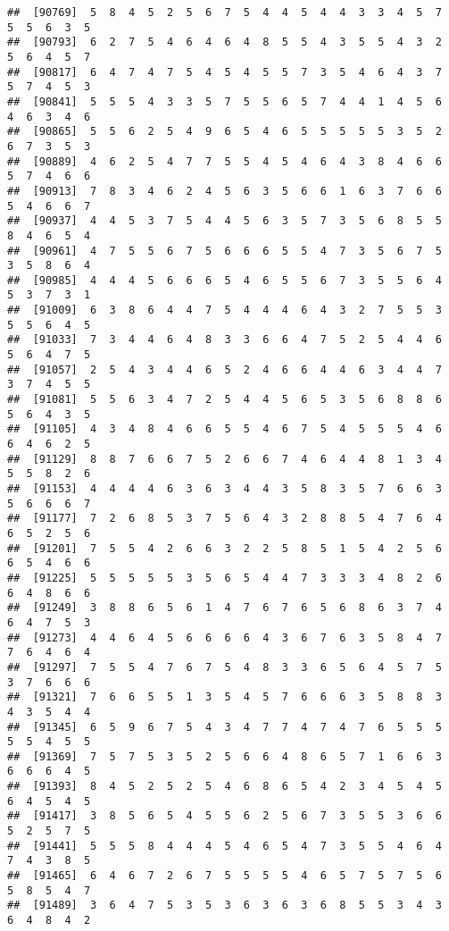 \documentclass[
]{book}
\begin{document}
\begin{verbatim}
##  [90769]  5  8  4  5  2  5  6  7  5  4  4  5  4  4  3  3  4  5  7  5  5  6  3  5
##  [90793]  6  2  7  5  4  6  4  6  4  8  5  5  4  3  5  5  4  3  2  5  6  4  5  7
##  [90817]  6  4  7  4  7  5  4  5  4  5  5  7  3  5  4  6  4  3  7  5  7  4  5  3
##  [90841]  5  5  5  4  3  3  5  7  5  5  6  5  7  4  4  1  4  5  6  4  6  3  4  6
##  [90865]  5  5  6  2  5  4  9  6  5  4  6  5  5  5  5  5  3  5  2  6  7  3  5  3
##  [90889]  4  6  2  5  4  7  7  5  5  4  5  4  6  4  3  8  4  6  6  5  7  4  6  6
##  [90913]  7  8  3  4  6  2  4  5  6  3  5  6  6  1  6  3  7  6  6  5  4  6  6  7
##  [90937]  4  4  5  3  7  5  4  4  5  6  3  5  7  3  5  6  8  5  5  8  4  6  5  4
##  [90961]  4  7  5  5  6  7  5  6  6  6  5  5  4  7  3  5  6  7  5  3  5  8  6  4
##  [90985]  4  4  4  5  6  6  6  5  4  6  5  5  6  7  3  5  5  6  4  5  3  7  3  1
##  [91009]  6  3  8  6  4  4  7  5  4  4  4  6  4  3  2  7  5  5  3  5  5  6  4  5
##  [91033]  7  3  4  4  6  4  8  3  3  6  6  4  7  5  2  5  4  4  6  5  6  4  7  5
##  [91057]  2  5  4  3  4  4  6  5  2  4  6  6  4  4  6  3  4  4  7  3  7  4  5  5
##  [91081]  5  5  6  3  4  7  2  5  4  4  5  6  5  3  5  6  8  8  6  5  6  4  3  5
##  [91105]  4  3  4  8  4  6  6  5  5  4  6  7  5  4  5  5  5  4  6  6  4  6  2  5
##  [91129]  8  8  7  6  6  7  5  2  6  6  7  4  6  4  4  8  1  3  4  5  5  8  2  6
##  [91153]  4  4  4  4  6  3  6  3  4  4  3  5  8  3  5  7  6  6  3  5  6  6  6  7
##  [91177]  7  2  6  8  5  3  7  5  6  4  3  2  8  8  5  4  7  6  4  6  5  2  5  6
##  [91201]  7  5  5  4  2  6  6  3  2  2  5  8  5  1  5  4  2  5  6  6  5  4  6  6
##  [91225]  5  5  5  5  5  3  5  6  5  4  4  7  3  3  3  4  8  2  6  6  4  8  6  6
##  [91249]  3  8  8  6  5  6  1  4  7  6  7  6  5  6  8  6  3  7  4  6  4  7  5  3
##  [91273]  4  4  6  4  5  6  6  6  6  4  3  6  7  6  3  5  8  4  7  7  6  4  6  4
##  [91297]  7  5  5  4  7  6  7  5  4  8  3  3  6  5  6  4  5  7  5  3  7  6  6  6
##  [91321]  7  6  6  5  5  1  3  5  4  5  7  6  6  6  3  5  8  8  3  4  3  5  4  4
##  [91345]  6  5  9  6  7  5  4  3  4  7  7  4  7  4  7  6  5  5  5  5  5  4  5  5
##  [91369]  7  5  7  5  3  5  2  5  6  6  4  8  6  5  7  1  6  6  3  6  6  6  4  5
##  [91393]  8  4  5  2  5  2  5  4  6  8  6  5  4  2  3  4  5  4  5  6  4  5  4  5
##  [91417]  3  8  5  6  5  4  5  5  6  2  5  6  7  3  5  5  3  6  6  5  2  5  7  5
##  [91441]  5  5  5  8  4  4  4  5  4  6  5  4  7  3  5  5  4  6  4  7  4  3  8  5
##  [91465]  6  4  6  7  2  6  7  5  5  5  5  4  6  5  7  5  7  5  6  5  8  5  4  7
##  [91489]  3  6  4  7  5  3  5  3  6  3  6  3  6  8  5  5  3  4  3  6  4  8  4  2

\end{verbatim}
\end{document}
